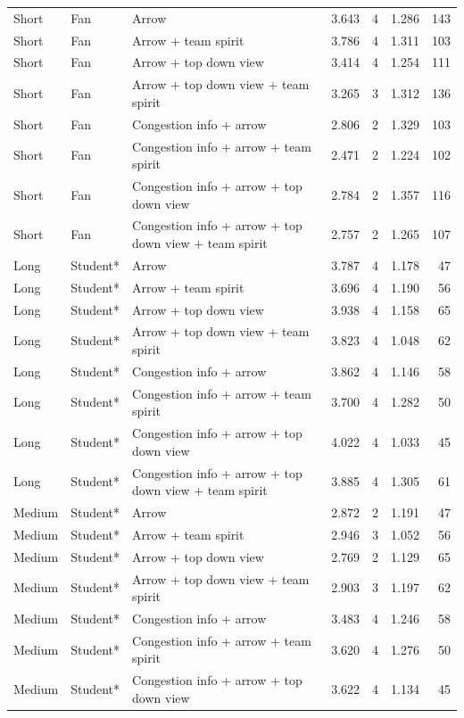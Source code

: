 \begin{table}[H]
\begin{scriptsize}
\begin{tabular}{lllrrrr}
   Short & Fan & Arrow & 3.643 & 4 & 1.286 & 143 \\
   Short & Fan & Arrow + team spirit & 3.786 & 4 & 1.311 & 103 \\
   Short & Fan & Arrow + top down view & 3.414 & 4 & 1.254 & 111 \\
   Short & Fan & Arrow + top down view + team spirit & 3.265 & 3 & 1.312 & 136 \\
   Short & Fan & Congestion info + arrow & 2.806 & 2 & 1.329 & 103 \\
   Short & Fan & Congestion info + arrow + team spirit & 2.471 & 2 & 1.224 & 102 \\
   Short & Fan & Congestion info + arrow + top down view & 2.784 & 2 & 1.357 & 116 \\
   Short & Fan & Congestion info + arrow + top down view + team spirit & 2.757 & 2 & 1.265 & 107 \\
   Long & Student* & Arrow & 3.787 & 4 & 1.178 & 47 \\
   Long & Student* & Arrow + team spirit & 3.696 & 4 & 1.190 & 56 \\
   Long & Student* & Arrow + top down view & 3.938 & 4 & 1.158 & 65 \\
   Long & Student* & Arrow + top down view + team spirit & 3.823 & 4 & 1.048 & 62 \\
   Long & Student* & Congestion info + arrow & 3.862 & 4 & 1.146 & 58 \\
   Long & Student* & Congestion info + arrow + team spirit & 3.700 & 4 & 1.282 & 50 \\
   Long & Student* & Congestion info + arrow + top down view & 4.022 & 4 & 1.033 & 45 \\
   Long & Student* & Congestion info + arrow + top down view + team spirit & 3.885 & 4 & 1.305 & 61 \\
   Medium & Student* & Arrow & 2.872 & 2 & 1.191 & 47 \\
   Medium & Student* & Arrow + team spirit & 2.946 & 3 & 1.052 & 56 \\
   Medium & Student* & Arrow + top down view & 2.769 & 2 & 1.129 & 65 \\
   Medium & Student* & Arrow + top down view + team spirit & 2.903 & 3 & 1.197 & 62 \\
   Medium & Student* & Congestion info + arrow & 3.483 & 4 & 1.246 & 58 \\
   Medium & Student* & Congestion info + arrow + team spirit & 3.620 & 4 & 1.276 & 50 \\
   Medium & Student* & Congestion info + arrow + top down view & 3.622 & 4 & 1.134 & 45 \\

\end{tabular}
\end{scriptsize}
\end{table}
